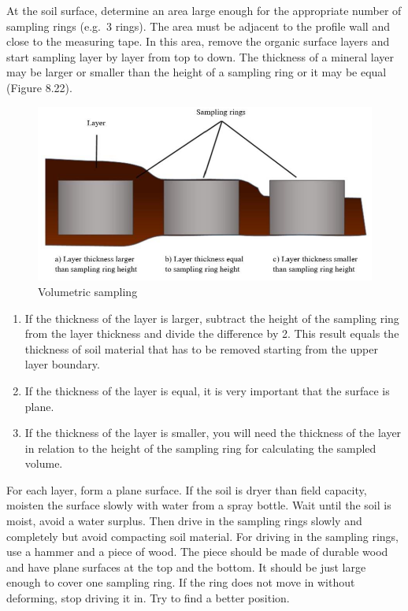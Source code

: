 \documentclass[
  letterpaper,
  DIV=11,
  numbers=noendperiod]{scrreprt}
\providecommand{\tightlist}{%
  \setlength{\itemsep}{0pt}\setlength{\parskip}{0pt}}\usepackage{longtable,booktabs,array}
\begin{document}
At the soil surface, determine an area large enough for the appropriate
number of sampling rings (e.g.~3 rings). The area must be adjacent to
the profile wall and close to the measuring tape. In this area, remove
the organic surface layers and start sampling layer by layer from top to
down. The thickness of a mineral layer may be larger or smaller than the
height of a sampling ring or it may be equal (Figure 8.22).

\begin{figure}

{\centering \includegraphics{./figure_8-22.png}

}

\caption{Volumetric sampling}

\end{figure}

\begin{enumerate}
\def\labelenumi{\alph{enumi}.}
\tightlist
\item
  If the thickness of the layer is larger, subtract the height of the
  sampling ring from the layer thickness and divide the difference by 2.
  This result equals the thickness of soil material that has to be
  removed starting from the upper layer boundary.
\item
  If the thickness of the layer is equal, it is very important that the
  surface is plane.
\item
  If the thickness of the layer is smaller, you will need the thickness
  of the layer in relation to the height of the sampling ring for
  calculating the sampled volume.
\end{enumerate}

For each layer, form a plane surface. If the soil is dryer than field
capacity, moisten the surface slowly with water from a spray bottle.
Wait until the soil is moist, avoid a water surplus. Then drive in the
sampling rings slowly and completely but avoid compacting soil material.
For driving in the sampling rings, use a hammer and a piece of wood. The
piece should be made of durable wood and have plane surfaces at the top
and the bottom. It should be just large enough to cover one sampling
ring. If the ring does not move in without deforming, stop driving it
in. Try to find a better position.
\end{document}
